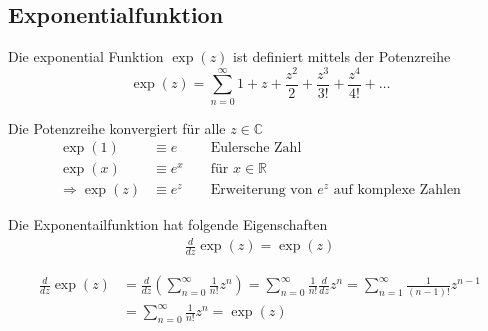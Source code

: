 \subsection{Exponentialfunktion}
\begin{Definition}[Exponentialfunktion]
Die exponential Funktion $\exp(z)$ ist definiert mittels der Potenzreihe
\begin{equation}
\exp(z) = \sum \limits_{n = 0}^\infty {1 + z +
\frac{z^2}{2} + \frac{z^3}{3!} + \frac{z^4}{4!} + \ldots}
\end{equation}
\end{Definition}

\begin{Bemerkung}
Die Potenzreihe konvergiert für alle $z \in \mathbb{C}$
\begin{align*}
\exp(1) &\equiv e && \text{ Eulersche Zahl}\\
\exp(x) &\equiv e^x && \text{ für } x \in \mathbb{R}\\
\Rightarrow \exp(z) &\equiv e^z && \text{ Erweiterung von } e^z \text{ auf
komplexe Zahlen}
\end{align*}
\end{Bemerkung}

Die Exponentailfunktion hat folgende Eigenschaften
\begin{align*}
\frac{d}{dz} \exp(z) = \exp(z)
\end{align*}
\begin{info}
\begin{align*}
\frac{d}{dz} \exp(z) &= \frac{d}{dz} \left(\sum \limits_{n = 0}^{\infty}
\frac{1}{n!}z^n \right) 
= \sum \limits_{n=0}^{\infty} \frac{1}{n!} \frac{d}{dz} z^n
= \sum \limits_{n=1}^{\infty} \frac{1}{(n-1)!} z^{n-1} \\
& = \sum \limits_{n=0}^{\infty} \frac{1}{n!} z^{n} = \exp(z)
\end{align*}
\end{info}

